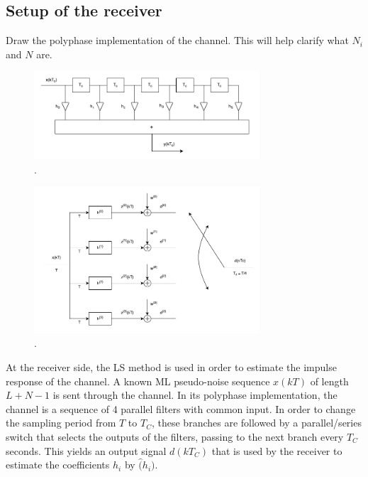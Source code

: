 \documentclass[10pt]{article}
\numberwithin{equation}{section}
\begin{document}
\subsection*{Setup of the receiver}
Draw the polyphase implementation of the channel. This will help clarify what $N_i$ and $N$ are.

\begin{figure}[ht]
	\centering
	\includegraphics[width=0.75\textwidth]{channel_model}
	\caption{.}
    \label{fig:channel_model}
\end{figure}

\begin{figure}[ht]
	\centering
	\includegraphics[width=0.75\textwidth]{polyphase}
	\caption{.}
    \label{fig:polyphase}
\end{figure}

At the receiver side, the LS method is used in order to estimate the impulse response of the channel. A known ML pseudo-noise sequence $x(kT)$ of length $L + N - 1$ is sent through the channel. In its polyphase implementation, the channel is a sequence of 4 parallel filters with common input. In order to change the sampling period from $T$ to $T_C$, these branches are followed by a parallel/series switch that selects the outputs of the filters, passing to the next branch every $T_C$ seconds. This yields an output signal $d(kT_C)$ that is used by the receiver to estimate the coefficients $h_i$ by $\hat(h_i)$.
\end{document}
